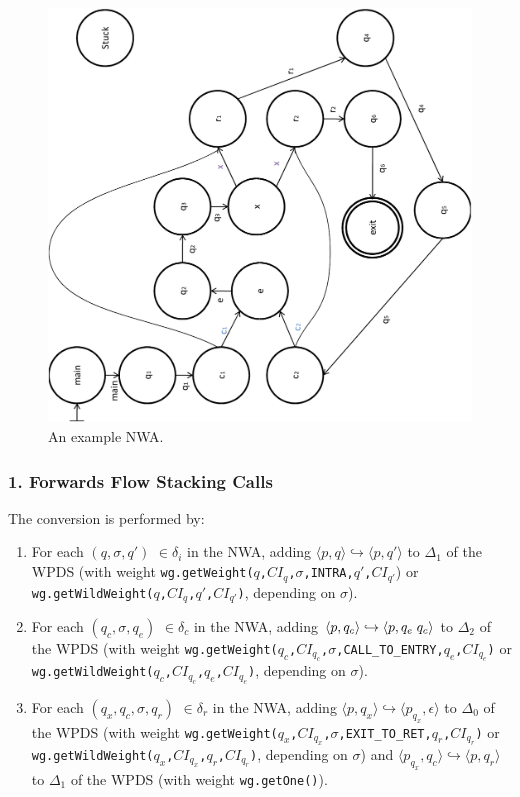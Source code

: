 \begin{figure}[htbp]
  \centering
    \includegraphics[width=12cm]{Figures/Figure23}
  \caption{An example NWA.}
  \label{Fig:NWAtoPDS1}
\end{figure}

\subsubsection{1. Forwards Flow Stacking Calls}

\noindent The conversion is performed by:

\begin{enumerate}

\item For each $(q,\sigma,q')$ $\in \delta_i$ in the NWA, adding $\langle p,q
  \rangle \hookrightarrow \langle p,q' \rangle$ to $\Delta_1$ of the WPDS
  (with weight
  \texttt{wg.getWeight($q$,$CI_q$,$\sigma$,INTRA,$q'$,$CI_{q'}$}) or
  \texttt{wg.getWildWeight($q$,$CI_q$,$q'$,$CI_{q'}$)}, depending on
  $\sigma$).

\item For each $(q_c,\sigma, q_e)$ $\in \delta_c$ in the NWA, adding $\langle
  p,q_c \rangle \hookrightarrow \langle p, q_e \hspace{.1cm} q_c \rangle$ to
  $\Delta_2$ of the WPDS (with weight
  \texttt{wg.getWeight($q_c$,$CI_{q_c}$,$\sigma$,CALL\_TO\_ENTRY,$q_e$,$CI_{q_e}$)}
  or \texttt{wg.getWildWeight($q_c$,$CI_{q_c}$,$q_e$,$CI_{q_e}$)}, depending
  on $\sigma$).

\item For each $(q_x,q_c,\sigma,q_r)$ $\in \delta_r$ in the NWA, adding
  $\langle p,q_x \rangle \hookrightarrow \langle p_{q_x},\epsilon \rangle$ to
  $\Delta_0$ of the WPDS (with weight
  \texttt{wg.getWeight($q_x$,$CI_{q_x}$,$\sigma$,EXIT\_TO\_RET,$q_r$,$CI_{q_r}$)}
  or \texttt{wg.getWildWeight($q_x$,$CI_{q_x}$,$q_r$,$CI_{q_r}$)}, depending
  on $\sigma$) and $\langle p_{q_x},q_c \rangle \hookrightarrow \langle p,q_r
  \rangle$ to $\Delta_1$ of the WPDS (with weight \texttt{wg.getOne()}).

\end{enumerate}

